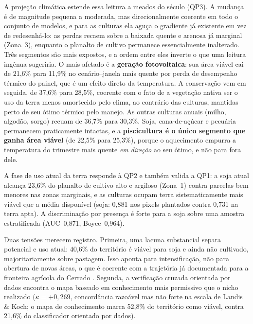 A projeção climática estende essa leitura a meados do século (QP3). A mudança é de magnitude
pequena a moderada, mas direcionalmente coerente em todo o conjunto de modelos, e para as
culturas ela aguça o gradiente já existente em vez de redesenhá-lo: as perdas recaem sobre a
baixada quente e arenosa já marginal (Zona~3), enquanto o planalto de cultivo permanece
essencialmente inalterado. Três segmentos são mais expostos, e a ordem entre eles inverte o que
uma leitura ingênua sugeriria. O mais afetado é a \textbf{geração fotovoltaica}: sua área viável
cai de 21,6\% para 11,9\% no cenário--janela mais quente por perda de
desempenho térmico do painel, que é um efeito direto da temperatura.
A conservação vem em seguida, de 37,6\% para 28,5\%, coerente com o fato de a vegetação nativa
ser o uso da terra menos amortecido pelo clima, ao contrário das culturas, mantidas perto de seu
ótimo térmico pelo manejo. As outras culturas anuais (milho, algodão, sorgo) recuam de 36,7\%
para 30,3\%. Soja, cana-de-açúcar e pecuária permanecem praticamente intactas, e a
\textbf{piscicultura é o único segmento que ganha área viável} (de 22,5\% para 25,3\%), porque o
aquecimento empurra a temperatura do trimestre mais quente \emph{em direção} ao seu ótimo, e não
para fora dele.

A fase de uso atual da terra responde à QP2 e também valida a QP1: a soja atual alcança 23,6\% 
do planalto de cultivo alto e argiloso (Zona~1)
contra parcelas bem menores nas zonas marginais, e as culturas ocupam terra sistematicamente
mais viável que a média disponível (soja: 0,881 nos pixels plantados contra 0,731 na terra
apta). A discriminação por presença é forte para a soja sobre uma amostra estratificada (AUC~0,871, Boyce~0,964).


Duas tensões merecem registro. Primeira, uma lacuna substancial separa potencial e uso atual:
40,6\% do território é viável para soja e ainda não cultivado, majoritariamente sobre pastagem.
Isso aponta para intensificação, não para abertura de novas áreas, o que é coerente com a
trajetória já documentada para a fronteira agrícola do Cerrado \citep{spera_agricultural_2017,caballero_transformation_2023}.
Segunda, a verificação cruzada orientada por dados encontra o mapa baseado em conhecimento mais
permissivo que o nicho realizado ($\kappa=+0{,}269$, concordância razoável mas não forte na
escala de Landis \& Koch; o mapa de conhecimento marca 52,8\% do território como viável,
contra 21,6\% do classificador orientado por dados).

